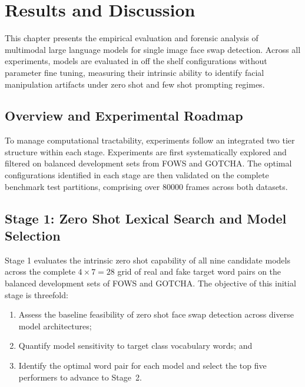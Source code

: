 \chapter{Results and Discussion}
\label{chap:results}

This chapter presents the empirical evaluation and forensic analysis of multimodal large language models for single image face swap detection. Across all experiments, models are evaluated in off the shelf configurations without parameter fine tuning, measuring their intrinsic ability to identify facial manipulation artifacts under zero shot and few shot prompting regimes.

\section{Overview and Experimental Roadmap}
\label{sec:results_overview}

To manage computational tractability, experiments follow an integrated two tier structure within each stage. Experiments are first systematically explored and filtered on balanced development sets from FOWS and GOTCHA. The optimal configurations identified in each stage are then validated on the complete benchmark test partitions, comprising over \num{80000} frames across both datasets.


\section{Stage 1: Zero Shot Lexical Search and Model Selection}
\label{sec:results_stage1}

Stage 1 evaluates the intrinsic zero shot capability of all nine candidate models across the complete $4 \times 7 = 28$ grid of real and fake target word pairs on the balanced development sets of FOWS and GOTCHA. The objective of this initial stage is threefold:
\begin{enumerate}
    \item Assess the baseline feasibility of zero shot face swap detection across diverse model architectures;
    \item Quantify model sensitivity to target class vocabulary words; and
    \item Identify the optimal word pair for each model and select the top five performers to advance to Stage~2.
\end{enumerate}

